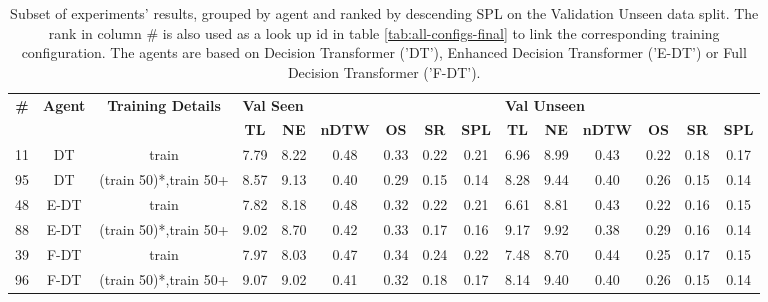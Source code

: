 \begin{table}
\centering
\caption{\label{tab:split_training_50}Subset of experiments' results, grouped by agent and ranked by descending SPL on the Validation Unseen data split. The rank in column \# is also used as a look up id in table \ref{tab:all-configs-final} to link the corresponding training configuration.     \newline The agents are based on Decision Transformer ('DT'), Enhanced Decision Transformer ('E-DT') or Full Decision Transformer ('F-DT').}
\begin{tabular}{@{\hskip3pt}c@{\hskip3pt}c@{\hskip3pt}c@{\hskip3pt}c@{\hskip3pt}c@{\hskip3pt}c@{\hskip3pt}c@{\hskip3pt}c@{\hskip3pt}c@{\hskip3pt}c@{\hskip3pt}c@{\hskip3pt}c@{\hskip3pt}c@{\hskip3pt}c@{\hskip3pt}c}
\toprule
\textbf{\#} & \textbf{Agent} & \textbf{Training Details} & \multicolumn{6}{l}{\textbf{Val Seen}} & \multicolumn{6}{l}{\textbf{Val Unseen}} \\
 \textbf{~} &     \textbf{~} &                \textbf{~} &       \textbf{TL} & \textbf{NE} & \textbf{nDTW} & \textbf{OS} & \textbf{SR} & \textbf{SPL} &         \textbf{TL} & \textbf{NE} & \textbf{nDTW} & \textbf{OS} & \textbf{SR} & \textbf{SPL} \\
\midrule
         11 &             DT &                     train &              7.79 &        8.22 &          0.48 &        0.33 &        0.22 &         0.21 &                6.96 &        8.99 &          0.43 &        0.22 &        0.18 &         0.17 \\
         95 &             DT &     (train 50)*,train 50+ &              8.57 &        9.13 &          0.40 &        0.29 &        0.15 &         0.14 &                8.28 &        9.44 &          0.40 &        0.26 &        0.15 &         0.14 \\
         48 &           E-DT &                     train &              7.82 &        8.18 &          0.48 &        0.32 &        0.22 &         0.21 &                6.61 &        8.81 &          0.43 &        0.22 &        0.16 &         0.15 \\
         88 &           E-DT &     (train 50)*,train 50+ &              9.02 &        8.70 &          0.42 &        0.33 &        0.17 &         0.16 &                9.17 &        9.92 &          0.38 &        0.29 &        0.16 &         0.14 \\
         39 &           F-DT &                     train &              7.97 &        8.03 &          0.47 &        0.34 &        0.24 &         0.22 &                7.48 &        8.70 &          0.44 &        0.25 &        0.17 &         0.15 \\
         96 &           F-DT &     (train 50)*,train 50+ &              9.07 &        9.02 &          0.41 &        0.32 &        0.18 &         0.17 &                8.14 &        9.40 &          0.40 &        0.26 &        0.15 &         0.14 \\
\bottomrule
\end{tabular}
\end{table}
